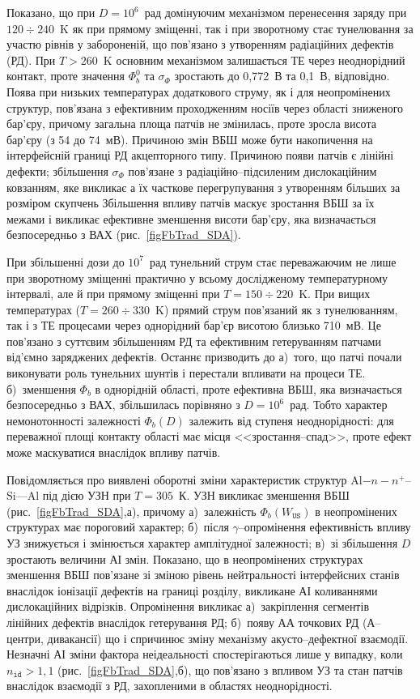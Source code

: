 Показано, що при $D=10^6$~рад домінуючим механізмом перенесення заряду при $120\div240$~K як при прямому зміщенні, так і при зворотному стає тунелювання за участю рівнів у забороненій, що пов'язано з утворенням радіаційних дефектів (РД).
При $T>260$~K основним механізмом залишається ТЕ через неоднорідний контакт, проте значення $\Phi_b^0$ та $\sigma_{\Phi}$
зростають до 0,772~В та 0,1~В, відповідно.
Поява при низьких температурах додаткового струму, як і для неопромінених структур, пов'язана з ефективним проходженням носіїв через області зниженого бар'єру,
причому загальна площа патчів не змінилась, проте зросла висота бар'єру (з 54 до 74~мВ).
Причиною змін ВБШ може бути накопичення на інтерфейсній границі РД акцепторного типу.
Причиною появи патчів є лінійні дефекти; збільшення $\sigma_{\Phi}$ пов'язане з  радіаційно--підсиленим дислокаційним ковзанням,
яке викликає а їх часткове перегрупування з утворенням більших за розміром скупчень
Збільшення впливу патчів маскує зростання ВБШ за їх межами і викликає ефективне зменшення висоти бар'єру, яка визначається безпосередньо з ВАХ (рис.~\ref{figFbTrad_SDA}).

При збільшенні дози до $10^7$~рад тунельний струм стає переважаючим не лише при зворотному зміщенні практично у всьому дослідженому температурному інтервалі,
але й при прямому зміщенні при $T=150\div220$~K.
При вищих температурах ($T=260\div330$~K) прямий струм пов'язаний як з тунелюванням, так і з ТЕ процесами через однорідний бар'єр висотою близько 710~мВ.
Це пов'язано з суттєвим збільшенням РД та ефективним гетеруванням патчами від'ємно заряджених дефектів.
Останнє призводить до
а)~того, що патчі почали виконувати роль тунельних шунтів і перестали впливати на процеси ТЕ.
б)~зменшення $\Phi_b$ в однорідній області, проте ефективна ВБШ, яка визначається безпосередньо з ВАХ, збільшилась порівняно з  $D=10^6$~рад.
Тобто характер немонотонності залежності $\Phi_b(D)$ залежить від ступеня неоднорідності:
для переважної площі контакту області має місця <<зростання--спад>>, проте ефект може маскуватися внаслідок впливу патчів.

Повідомляється про виявлені оборотні зміни характеристик структур Al$-n-n^+$--Si---Al під дією УЗН при $T=305$~К.
УЗН викликає зменшення ВБШ (рис.~\ref{figFbTrad_SDA},а), причому
а)~залежність $\Phi_b(W_\mathtt{US})$ в неопромінених структурах має пороговий характер;
б)~після $\gamma$--опромінення ефективність впливу УЗ знижується і змінюється характер амплітудної залежності;
в)~зі збільшення $D$ зростають величини АІ змін.
Показано, що в неопромінених структурах зменшення ВБШ пов'язане зі зміною рівень нейтральності інтерфейсних станів
внаслідок іонізації дефектів на границі розділу, викликане АІ коливаннями дислокаційних відрізків.
Опромінення викликає
а)~закріплення сегментів лінійних дефектів внаслідок гетерування РД;
б)~появу АА точкових РД (А--центри, дивакансії)
що і спричинює зміну механізму акусто--дефектної взаємодії.
Незначні АІ зміни фактора неідеальності спостерігаються лише у випадку, коли $n_\mathtt{id}>1,1$ (рис.~\ref{figFbTrad_SDA},б),
що пов'язано з впливом УЗ та стан патчів внаслідок взаємодії з РД, захопленими в областях неоднорідності.

